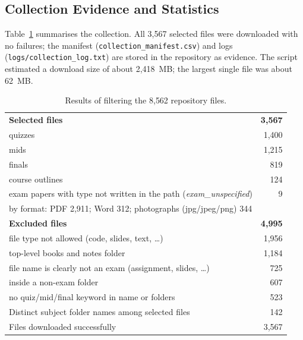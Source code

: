 \documentclass[11pt,a4paper]{article}
\newcommand{\file}[1]{\texttt{#1}}
\begin{document}
\subsection{Collection Evidence and Statistics}
Table~\ref{tab:collection} summarises the collection. All 3{,}567 selected files were downloaded with no failures; the manifest (\file{collection\_manifest.csv}) and logs (\file{logs/collection\_log.txt}) are stored in the repository as evidence. The script estimated a download size of about 2{,}418~MB; the largest single file was about 62~MB.

\begin{table}[H]
\centering
\caption{Results of filtering the 8{,}562 repository files.}
\label{tab:collection}
\begin{tabularx}{\linewidth}{Xr}
\toprule
\textbf{Selected files} & \textbf{3{,}567} \\
\quad quizzes & 1{,}400 \\
\quad mids & 1{,}215 \\
\quad finals & 819 \\
\quad course outlines & 124 \\
\quad exam papers with type not written in the path (\emph{exam\_unspecified}) & 9 \\
\quad by format: PDF 2{,}911; Word 312; photographs (jpg/jpeg/png) 344 & \\
\midrule
\textbf{Excluded files} & \textbf{4{,}995} \\
\quad file type not allowed (code, slides, text, \ldots) & 1{,}956 \\
\quad top-level books and notes folder & 1{,}184 \\
\quad file name is clearly not an exam (assignment, slides, \ldots) & 725 \\
\quad inside a non-exam folder & 607 \\
\quad no quiz/mid/final keyword in name or folders & 523 \\
\midrule
Distinct subject folder names among selected files & 142 \\
Files downloaded successfully & 3{,}567 \\
\bottomrule
\end{tabularx}
\end{table}
\end{document}
